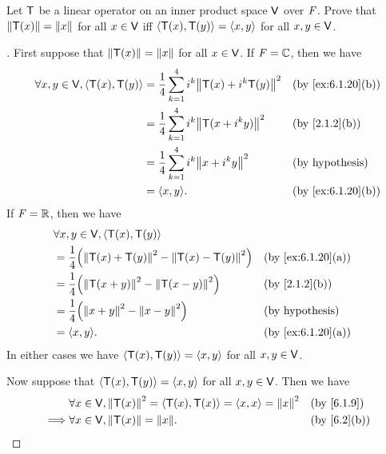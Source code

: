 \begin{ex}\label{ex:6.3.10}
  Let \(\mathsf{T}\) be a linear operator on an inner product space \(\mathsf{V}\) over \(\mathit{F}\).
  Prove that \(\left\lVert\mathsf{T}(x)\right\rVert = \left\lVert x\right\rVert\) for all \(x \in \mathsf{V}\) iff \(\left\langle\mathsf{T}(x), \mathsf{T}(y)\right\rangle = \left\langle x,y\right\rangle\) for all \(x, y \in \mathsf{V}\).
\end{ex}

\begin{proof}[]
  First suppose that \(\left\lVert\mathsf{T}(x)\right\rVert = \left\lVert x\right\rVert\) for all \(x \in \mathsf{V}\).
  If \(\mathit{F} = \mathbb{C}\), then we have
  \begin{align*}
    \forall x, y \in \V, \inn{\T(x), \T(y)} & = \frac{1}{4} \sum_{k = 1}^4 i^k \norm{\T(x) + i^k \T(y)}^2 &  & \text{(by \cref{ex:6.1.20}(b))} \\
                                            & = \frac{1}{4} \sum_{k = 1}^4 i^k \norm{\T(x + i^k y)}^2     &  & \text{(by \cref{2.1.2}(b))}     \\
                                            & = \frac{1}{4} \sum_{k = 1}^4 i^k \norm{x + i^k y}^2         &  & \text{(by hypothesis)}          \\
                                            & = \inn{x, y}.                                               &  & \text{(by \cref{ex:6.1.20}(b))}
  \end{align*}
  If \(\mathit{F} = \mathbb{R}\), then we have
  \begin{align*}
     & \forall x, y \in \V, \inn{\T(x), \T(y)}                                                                 \\
     & = \frac{1}{4} \pa{\norm{\T(x) + \T(y)}^2 - \norm{\T(x) - \T(y)}^2} &  & \text{(by \cref{ex:6.1.20}(a))} \\
     & = \frac{1}{4} \pa{\norm{\T(x + y)}^2 - \norm{\T(x - y)}^2}         &  & \text{(by \cref{2.1.2}(b))}     \\
     & = \frac{1}{4} \pa{\norm{x + y}^2 - \norm{x - y}^2}                 &  & \text{(by hypothesis)}          \\
     & = \inn{x, y}.                                                      &  & \text{(by \cref{ex:6.1.20}(a))}
  \end{align*}
  In either cases we have \(\left\langle\mathsf{T}(x), \mathsf{T}(y)\right\rangle = \left\langle x, y\right\rangle\) for all \(x, y \in \mathsf{V}\).

  Now suppose that \(\left\langle\mathsf{T}(x), \mathsf{T}(y)\right\rangle = \left\langle x, y\right\rangle\) for all \(x, y \in \mathsf{V}\).
  Then we have
  \begin{align*}
             & \forall x \in \V, \norm{\T(x)}^2 = \inn{\T(x), \T(x)} = \inn{x, x} = \norm{x}^2 &  & \text{(by \cref{6.1.9})}  \\
    \implies & \forall x \in \V, \norm{\T(x)} = \norm{x}.                                      &  & \text{(by \cref{6.2}(b))}
  \end{align*}
\end{proof}

